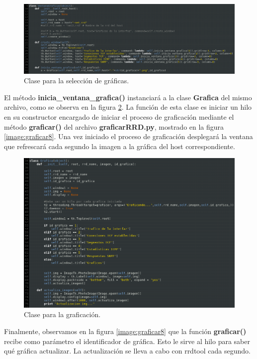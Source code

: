 \FloatBarrier
\begin{figure}[htbp!]
		\centering
			\includegraphics[width=.9 \textwidth]{images/graficar6}
		\caption{Clase para la selección de gráficas.}
		\label{image:graficar6}
\end{figure}
\FloatBarrier

El método \textbf{inicia\_ventana\_grafica()} instanciará a la clase \textbf{Grafica} del mismo archivo, como se observa en la figura \ref{image:graficar7}. La función de esta clase es iniciar un hilo en su constructor encargado de iniciar el proceso de graficación mediante el método \textbf{graficar()} del archivo \textbf{graficarRRD.py}, mostrado en la figura \ref{image:graficar8}. Una vez iniciado el proceso de graficación desplegará la ventana que refrescará cada segundo la imagen a la gráfica del host correspondiente.

\FloatBarrier
\begin{figure}[htbp!]
		\centering
			\includegraphics[width=.9 \textwidth]{images/graficar7}
		\caption{Clase para la graficación.}
		\label{image:graficar7}
\end{figure}
\FloatBarrier

Finalmente, observamos en la figura \ref{image:graficar8} que la función \textbf{graficar()} recibe como parámetro el identificador de gráfica. Esto le sirve al hilo para saber qué gráfica actualizar. La actualización se lleva a cabo con rrdtool cada segundo.

